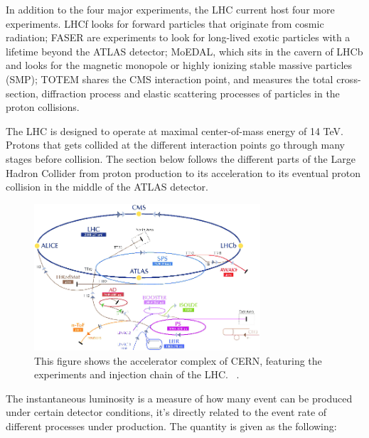 In addition to the four major experiments, the LHC current host four more experiments. LHCf looks for forward particles that originate from cosmic radiation; FASER are experiments to look for long-lived exotic particles with a lifetime beyond the ATLAS detector; MoEDAL, which sits in the cavern of LHCb and looks for the magnetic monopole or highly ionizing stable massive particles (SMP); TOTEM shares the CMS interaction point, and measures the total
cross-section, diffraction process and elastic scattering processes of particles in the proton collisions. 

The LHC is designed to operate at maximal center-of-mass energy of 14 TeV. Protons that gets collided at the different interaction points go through many stages before collision. The section below follows the different parts of the Large Hadron Collider from proton production to its acceleration to its eventual proton collision in the middle of the ATLAS detector. 

\begin{figure}[!htb]
    \begin{center}
        \includegraphics[width=0.75\textwidth]{figures/chapter_ATLAS/LHCAcceleratorComplex}
        \caption{
			This figure shows the accelerator complex of CERN, featuring the experiments and injection chain of the LHC. ~\cite{Marcastel:1621583}.
        }
        \label{fig:CERNAcceleratorComplex}
    \end{center}
\end{figure}




The instantaneous luminosity is a measure of how many event can be produced under certain detector conditions, it's directly related to the event rate of different processes under production.   
The quantity is given as the following:

